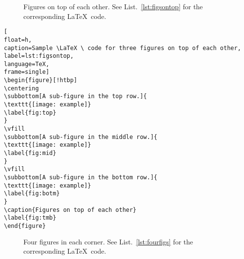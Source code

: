 \begin{figure}[!htbp]
\centering
{}
\vfill
{}
\vfill
{}
\caption{Figures on top of each other. See List.~\ref{lst:figsontop} for the corresponding \LaTeX \ code. } 
\label{fig:tmb}
\end{figure}
\cleardoublepage




\begin{lstlisting}[
float=h,
caption=Sample \LaTeX \ code for three figures on top of each other, 
label=lst:figsontop,
language=TeX,
frame=single]
\begin{figure}[!htbp]
\centering
\subbottom[A sub-figure in the top row.]{
\texttt{[image: example]}
\label{fig:top}
}
\vfill
\subbottom[A sub-figure in the middle row.]{
\texttt{[image: example]}
\label{fig:mid}
}
\vfill
\subbottom[A sub-figure in the bottom row.]{
\texttt{[image: example]}
\label{fig:botm}
}
\caption{Figures on top of each other} 
\label{fig:tmb}
\end{figure}
\end{lstlisting}
\cleardoublepage







\begin{figure}[!htbp]
\centering
{}
\hfill
{}
\vfill
{}
\hfill
{}
\caption{Four figures in each corner. See List.~\ref{lst:fourfigs} for the corresponding \LaTeX \ code.} 
\label{fig:fourfig}
\end{figure}
\cleardoublepage




